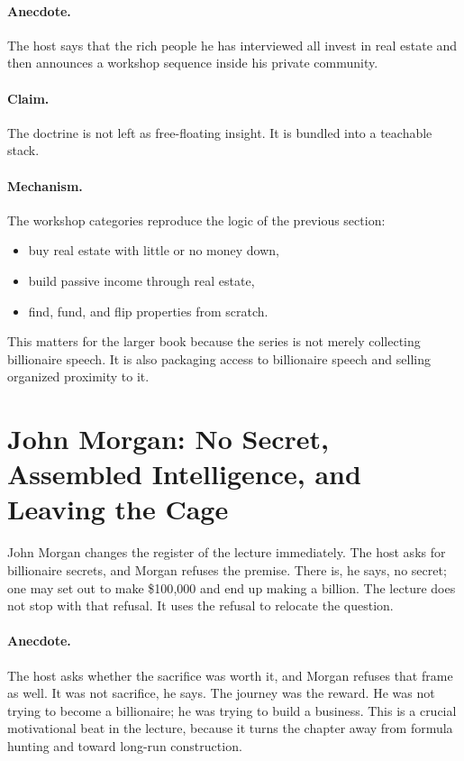 \paragraph{Anecdote.}
The host says that the rich people he has interviewed all invest in real estate and then announces a workshop sequence inside his private community.

\paragraph{Claim.}
The doctrine is not left as free-floating insight. It is bundled into a teachable stack.

\paragraph{Mechanism.}
The workshop categories reproduce the logic of the previous section:
\begin{itemize}
\item buy real estate with little or no money down,
\item build passive income through real estate,
\item find, fund, and flip properties from scratch.
\end{itemize}

This matters for the larger book because the series is not merely collecting billionaire speech. It is also packaging access to billionaire speech and selling organized proximity to it.

\section{John Morgan: No Secret, Assembled Intelligence, and Leaving the Cage}

John Morgan changes the register of the lecture immediately. The host asks for billionaire secrets, and Morgan refuses the premise. There is, he says, no secret; one may set out to make \$100{,}000 and end up making a billion. The lecture does not stop with that refusal. It uses the refusal to relocate the question.

\paragraph{Anecdote.}
The host asks whether the sacrifice was worth it, and Morgan refuses that frame as well. It was not sacrifice, he says. The journey was the reward. He was not trying to become a billionaire; he was trying to build a business. This is a crucial motivational beat in the lecture, because it turns the chapter away from formula hunting and toward long-run construction.

